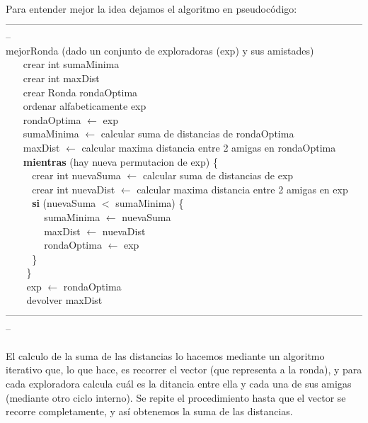 Para entender mejor la idea dejamos el algoritmo en pseudocódigo:\\   
--------------------------------------------------------------------------------------------------------------\\
mejorRonda (dado un conjunto de exploradoras (exp) y sus amistades) \\
$~~~~~~~~$crear int sumaMinima \\
$~~~~~~~~$crear int maxDist \\
$~~~~~~~~$crear Ronda rondaOptima  \\
$~~~~~~~~$ordenar alfabeticamente exp \\
$~~~~~~~~$rondaOptima $\leftarrow$ exp \\
$~~~~~~~~$sumaMinima $\leftarrow$ calcular suma de distancias de rondaOptima  \\
$~~~~~~~~$maxDist $\leftarrow$ calcular maxima distancia entre 2 amigas en rondaOptima \\
$~~~~~~~~$\textbf{mientras} (hay nueva permutacion de exp) \{ \\
$~~~~~~~~~~~~$crear int nuevaSuma $\leftarrow$ calcular suma de distancias de exp  \\
$~~~~~~~~~~~~$crear int nuevaDist $\leftarrow$ calcular maxima distancia entre 2 amigas en exp  \\
$~~~~~~~~~~~~$\textbf{si} (nuevaSuma $<$ sumaMinima) \{ \\
$~~~~~~~~~~~~~~~~$ sumaMinima $\leftarrow$ nuevaSuma \\
$~~~~~~~~~~~~~~~~$ maxDist $\leftarrow$ nuevaDist \\
$~~~~~~~~~~~~~~~~$ rondaOptima $\leftarrow$ exp \\
$~~~~~~~~~~~~$\} \\
$~~~~~~~~$ \} \\
$~~~~~~~~$ exp $\leftarrow$ rondaOptima\\
$~~~~~~~~$ devolver maxDist\\
--------------------------------------------------------------------------------------------------------------\\ \\
El calculo de la suma de las distancias lo hacemos mediante un algoritmo iterativo que, lo que hace, es recorrer el vector
(que representa a la ronda), y para cada exploradora calcula cuál es la ditancia entre ella y cada una de sus amigas (mediante 
otro ciclo interno). Se repite el procedimiento hasta que el vector se recorre completamente, y así obtenemos la suma de las distancias.  


